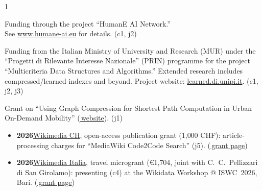 \documentclass[10pt,a4paper,ragged2e,academicons]{altacv}
\newif\ifshortcv
\begin{document}
\begin{paracol}{1}
\divider

Funding through the project ``HumanE AI Network.'' \\
See \href{https://www.humane-ai.eu}{www.humane-ai.eu} for details. (c1, j2)

\divider %

Funding from the Italian Ministry of University and Research (MUR) under the ``Progetti di Rilevante Interesse Nazionale'' (PRIN) programme for the project ``Multicriteria Data Structures and Algorithms.'' Extended research includes compressed/learned indexes and beyond. Project website: \href{https://learned.di.unipi.it}{learned.di.unipi.it}. (c1, j2, j3)

\divider

Grant on ``Using Graph Compression for Shortest Path Computation in Urban On-Demand Mobility'' (\href{https://old.unipi.it/index.php/finanziamenti-di-ateneo/itemlist/category/332-mit-unipi-project}{\faGlobe\,website}). (j1)
\fi


\ifshortcv\else%
\smallskip


{\small
\begin{itemize}[leftmargin=1.3em, itemsep=3pt, topsep=1pt, parsep=0pt]
  \item \textbf{2026}\enspace \href{https://wikimedia.ch}{Wikimedia CH}, open-access publication grant (1{,}000 CHF): article-processing charges for ``MediaWiki Code2Code Search'' (j5). {\footnotesize(\href{https://w.wiki/SrcE}{\faGlobe\,grant page})}
  \item \textbf{2026}\enspace \href{https://www.wikimedia.it}{Wikimedia Italia}, travel microgrant (\euro 1{,}704, joint with C.~C.~Pellizzari di San Girolamo): presenting (c4) at the Wikidata Workshop @ ISWC~2026, Bari. {\footnotesize(\href{https://w.wiki/UHgf}{\faGlobe\,grant page})}
\end{itemize}
}
\fi


\end{paracol}
\end{document}
